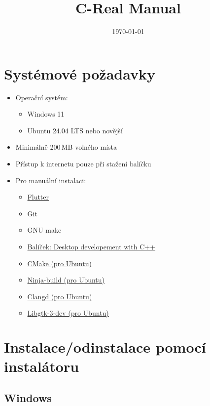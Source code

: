 \documentclass[12pt]{article}
\title{C-Real Manual}
\author{}
\date{\today}
\begin{document}
\maketitle{}

\tableofcontents

\clearpage
\newpage

\section{Systémové požadavky}

\begin{itemize}
    \item Operační systém:
    \begin{itemize}
        \item Windows 11
        \item Ubuntu 24.04 LTS nebo novější
    \end{itemize}
    \item Minimálně 200\,MB volného místa
    \item Přístup k internetu pouze při stažení balíčku
    \item Pro manuální instalaci:
    \begin{itemize}
        \item \href{https://docs.flutter.dev/install}{Flutter}
        \item Git
        \item GNU make
        \item \href{https://aka.ms/vs/stable/vs_BuildTools.exe}{Balíček: Desktop developement with C++}
        \item \href{}{CMake (pro Ubuntu)}
        \item \href{}{Ninja-build (pro Ubuntu)}
        \item \href{}{Clangd (pro Ubuntu)}
        \item \href{}{Libgtk-3-dev (pro Ubuntu)}
        
    \end{itemize}
\end{itemize}

\vspace{1.0cm}

\section{Instalace/odinstalace pomocí instalátoru}

\subsection{Windows}
\end{document}
